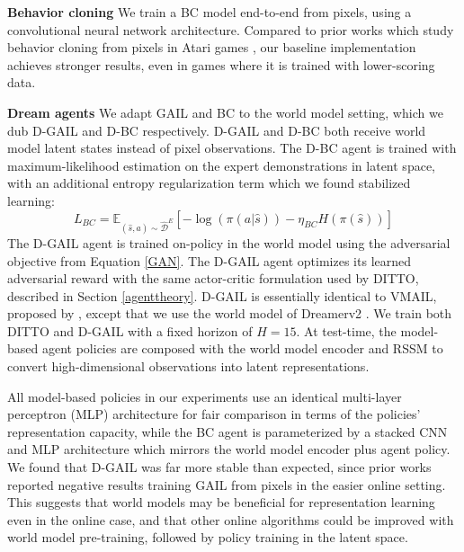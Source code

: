 \documentclass[10pt]{article} %
\theoremstyle{plain}
\theoremstyle{definition}
\theoremstyle{remark}
\begin{document}
\textbf{Behavior cloning}\hspace{0.3cm} We train a BC model end-to-end from pixels, using a convolutional neural network architecture. Compared to prior works which study behavior cloning from pixels in Atari games \citep{Hester2017}\citep{atarihead}\citep{BCbench}, our baseline implementation achieves stronger results, even in games where it is trained with lower-scoring data. 

\textbf{Dream agents}\hspace{0.3cm} We adapt GAIL \citep{GAIL} and BC to the world model setting, which we dub D-GAIL and D-BC respectively. D-GAIL and D-BC both receive world model latent states instead of pixel observations. The D-BC agent is trained with maximum-likelihood estimation on the expert demonstrations in latent space, with an additional entropy regularization term which we found stabilized learning:
\begin{equation}
    L_{BC} = \mathbb{E}_{(\hat{s},a) \sim \hat{\mathcal{D}}^E}\left[-\log\left( \pi(a|\hat{s})\right)  -\eta_{BC} H(\pi(\hat{s}))\right]
\end{equation}
The D-GAIL agent is trained on-policy in the world model using the adversarial objective from Equation \ref{GAN}. The D-GAIL agent optimizes its learned adversarial reward with the same actor-critic formulation used by DITTO, described in Section \ref{agenttheory}. D-GAIL is essentially identical to VMAIL, proposed by \cite{vmail}, except that we use the world model of Dreamerv2 \citep{dreamerv2}. We train both DITTO and D-GAIL with a fixed horizon of $H=15$. At test-time, the model-based agent policies are composed with the world model encoder and RSSM to convert high-dimensional observations into latent representations. 

All model-based policies in our experiments use an identical multi-layer perceptron (MLP) architecture for fair comparison in terms of the policies' representation capacity, while the BC agent is parameterized by a stacked CNN and MLP architecture which mirrors the world model encoder plus agent policy. We found that D-GAIL was far more stable than expected, since prior works \citep{sqil} \citep{DRIL} reported negative results training GAIL from pixels in the easier online setting. This suggests that world models may be beneficial for representation learning even in the online case, and that other online algorithms could be improved with world model pre-training, followed by policy training in the latent space.
\end{document}
